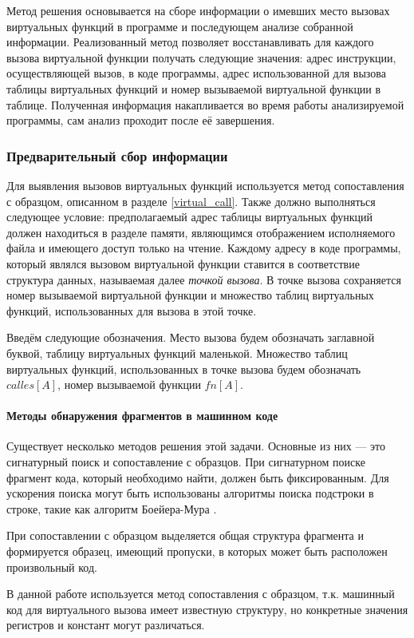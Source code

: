 \documentclass[a4paper,12pt,russian]{article}
\begin{document}
Метод решения основывается на сборе информации о имевших место вызовах виртуальных функций в программе и последующем анализе собранной информации.
Реализованный метод позволяет восстанавливать для каждого вызова виртуальной функции получать следующие значения: адрес инструкции, осуществляющей вызов, в коде программы, адрес использованной для вызова таблицы виртуальных функций и номер вызываемой виртуальной функции в таблице.
Полученная информация накапливается во время работы анализируемой программы, сам анализ проходит после её завершения.
\subsubsection{Предварительный сбор информации}
Для выявления вызовов виртуальных функций используется метод сопоставления с образцом, описанном в разделе \ref{virtual_call}.
Также должно выполняться следующее условие: предполагаемый адрес таблицы виртуальных функций должен находиться в разделе памяти, являющимся отображением исполняемого файла и имеющего доступ только на чтение.
Каждому адресу в коде программы, который являлся вызовом виртуальной функции ставится в соответствие структура данных, называемая далее \emph{точкой вызова}.
В точке вызова сохраняется номер вызываемой виртуальной функции и множество таблиц виртуальных функций, использованных для вызова в этой точке.

Введём следующие обозначения.
Место вызова будем обозначать заглавной буквой, таблицу виртуальных функций маленькой.
Множество таблиц виртуальных функций, использованных в точке вызова будем обозначать $calles[A]$, номер вызываемой функции $fn[A]$.
\paragraph{Методы обнаружения фрагментов в машинном коде}
Существует несколько методов решения этой задачи.
Основные из них --- это сигнатурный поиск и сопоставление с образцов.
При сигнатурном поиске фрагмент кода, который необходимо найти, должен быть фиксированным.
Для ускорения поиска могут быть использованы алгоритмы поиска подстроки в строке, такие как алгоритм Боейера-Мура \cite{corman}.

При сопоставлении с образцом выделяется общая структура фрагмента и формируется образец, имеющий пропуски, в которых может быть расположен произвольный код.

В данной работе используется метод сопоставления с образцом, т.к. машинный код для виртуального вызова имеет известную структуру, но конкретные значения регистров и констант могут различаться.
\end{document}
